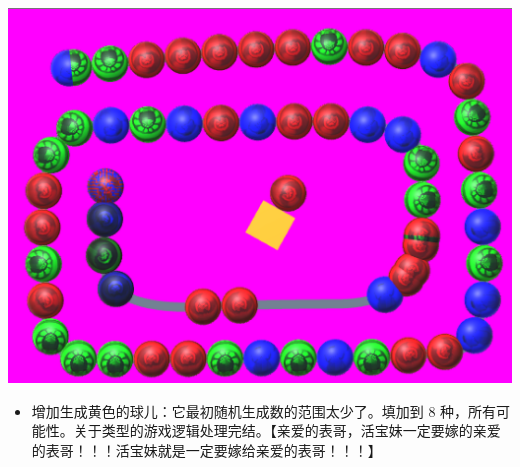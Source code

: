 \documentclass[9pt, b5paper]{article}
\begin{document}
\includegraphics[width=.9\linewidth]{./pic/readme_20230322_223217.png}
\begin{itemize}
\item 增加生成黄色的球儿：它最初随机生成数的范围太少了。填加到 8 种，所有可能性。关于类型的游戏逻辑处理完结。【亲爱的表哥，活宝妹一定要嫁的亲爱的表哥！！！活宝妹就是一定要嫁给亲爱的表哥！！！】
\end{itemize}
\end{document}
